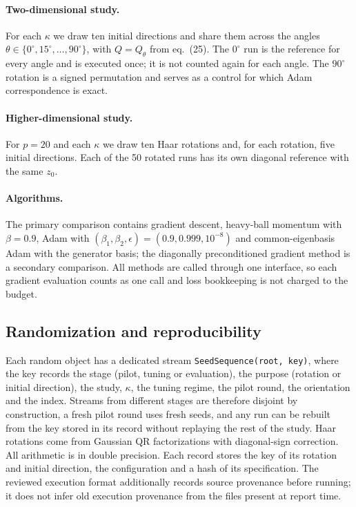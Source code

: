 \documentclass[11pt,a4paper]{article}
\newcommand{\code}[1]{\texttt{#1}}
\begin{document}
\paragraph{Two-dimensional study.} For each $\kappa$ we draw ten initial
directions and share them across the angles
$\theta\in\{0^\circ,15^\circ,\dots,90^\circ\}$, with $Q=Q_\theta$ from eq.~(25).
The $0^\circ$ run is the reference for every angle and is executed once; it is
not counted again for each angle. The $90^\circ$ rotation is a signed
permutation and serves as a control for which Adam correspondence is exact.

\paragraph{Higher-dimensional study.} For $p=20$ and each $\kappa$ we draw ten
Haar rotations and, for each rotation, five initial directions. Each of the 50
rotated runs has its own diagonal reference with the same $z_0$.

\paragraph{Algorithms.} The primary comparison contains gradient descent,
heavy-ball momentum with $\beta=0.9$, Adam with $(\beta_1,\beta_2,\epsilon)=
(0.9,0.999,10^{-8})$ and common-eigenbasis Adam with the generator basis; the
diagonally preconditioned gradient method is a secondary comparison. All
methods are called through one interface, so each gradient evaluation counts
as one call and loss bookkeeping is not charged to the budget.

\subsection{Randomization and reproducibility}
Each random object has a dedicated stream
\code{SeedSequence(root, key)}, where the key records the stage (pilot, tuning
or evaluation), the purpose (rotation or initial direction), the study,
$\kappa$, the tuning regime, the pilot round, the orientation and the index.
Streams from different stages are therefore disjoint by construction, a fresh
pilot round uses fresh seeds, and any run can be rebuilt from the key stored in
its record without replaying the rest of the study. Haar rotations come from
Gaussian QR factorizations with diagonal-sign correction. All arithmetic is in
double precision. Each record stores the key of its rotation and initial
direction, the configuration and a hash of its specification. The reviewed
execution format additionally records source provenance before running; it
does not infer old execution provenance from the files present at report time.
\end{document}
